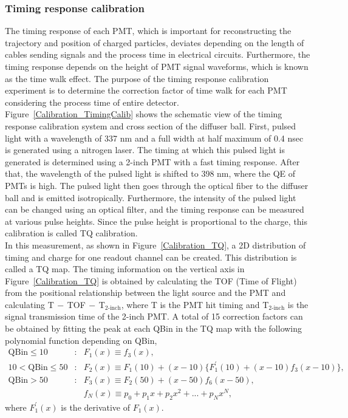 \subsubsection{Timing response calibration}
\vs\hs
The timing response of each PMT, which is important for reconstructing the trajectory and position of charged particles, deviates depending on the length of cables sending signals and the process time in electrical circuits.
Furthermore, the timing response depends on the height of PMT signal waveforms, which is known as the time walk effect.
The purpose of the timing response calibration experiment is to determine the correction factor of time walk for each PMT considering the process time of entire detector.\\
\hs
Figure~\ref{Calibration_TimingCalib} shows the schematic view of the timing response calibration system and cross section of the diffuser ball.
First, pulsed light with a wavelength of 337 nm and a full width at half maximum of 0.4 nsec is generated using a nitrogen laser.
The timing at which this pulsed light is generated is determined using a 2-inch PMT with a fast timing response.
After that, the wavelength of the pulsed light is shifted to 398 nm, where the QE of PMTs is high.
The pulsed light then goes through the optical fiber to the diffuser ball and is emitted isotropically.
Furthermore, the intensity of the pulsed light can be changed using an optical filter, and the timing response can be measured at various pulse heights.
Since the pulse height is proportional to the charge, this calibration is called TQ calibration.\\
\hs
In this measurement, as shown in Figure~\ref{Calibration_TQ}, a 2D distribution of timing and charge for one readout channel can be created.
This distribution is called a TQ map.
The timing information on the vertical axis in Figure~\ref{Calibration_TQ} is obtained by calculating the TOF (Time of Flight) from the positional relationship between the light source and the PMT and calculating T$\,-\,$TOF$\,-\,$T$_{\text{2-inch}}$, where T is the PMT hit timing and T$_{\text{2-inch}}$ is the signal transmission time of the 2-inch PMT.
A total of 15 correction factors can be obtained by fitting the peak at each QBin in the TQ map with the following polynomial function depending on QBin,
\begin{eqnarray}
	\text{QBin} \leq 10      &:& F_{1}(x) \equiv f_{3}(x), \\
	10 < \text{QBin} \leq 50 &:& F_{2}(x) \equiv F_{1}(10)+(x-10)\{F_{1}^{\prime}(10)+(x-10)f_{3}(x-10)\}, \\
	\text{QBin} > 50         &:& F_{3}(x) \equiv F_{2}(50)+(x-50)f_{6}(x-50), \\
	                         & & f_{N}(x) \equiv p_{0}+p_{1}x+p_{2}x^{2}+...+p_{N}x^{N},
\end{eqnarray}
where $F_{1}^{\prime}(x)$ is the derivative of $F_{1}(x)$.


